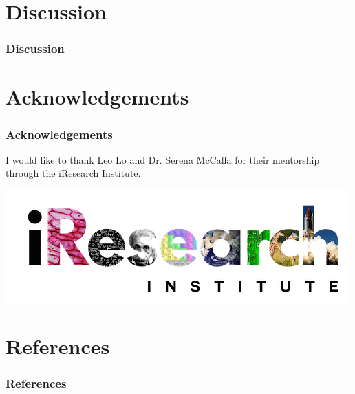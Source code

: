 \documentclass[12pt]{beamer}
\begin{document}
\section{Discussion}

\begin{frame}
\frametitle{Discussion}

\end{frame}

\section{Acknowledgements}


\begin{frame}
\frametitle{Acknowledgements}
I would like to thank Leo Lo and Dr. Serena McCalla for their mentorship through the iResearch Institute.

\includegraphics[scale = 0.55]{iresearch.png}


\end{frame}

\section{References}

\begin{frame}
\frametitle{References}
\end{frame}
\end{document}

